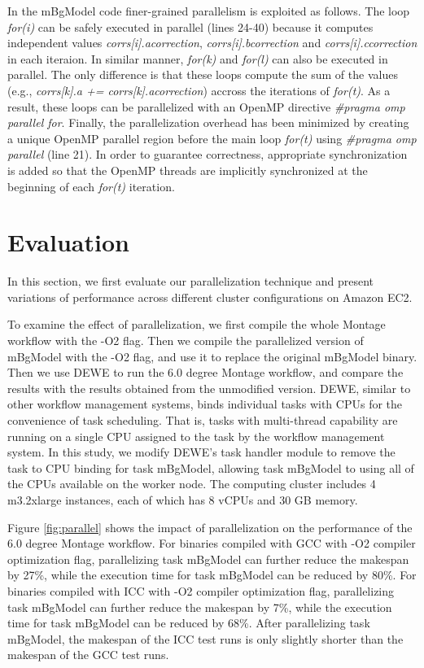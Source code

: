 In the mBgModel code finer-grained parallelism is exploited as follows. The loop {\em for(i)} can be safely executed in parallel (lines 24-40) because it computes independent values {\em corrs[i].acorrection}, {\em corrs[i].bcorrection} and {\em corrs[i].ccorrection} in each iteraion. In similar manner, {\em for(k)} and {\em for(l)} can also be executed in parallel. The only difference is that these loops compute the sum of the values (e.g., {\em corrs[k].a += corrs[k].acorrection}) accross the iterations of {\em for(t)}. As a result, these loops can be parallelized with an OpenMP directive {\em \#pragma omp parallel for}. Finally, the parallelization overhead has been minimized by creating a unique OpenMP parallel region before the main loop {\em for(t)} using {\em \#pragma omp parallel} (line 21). In order to guarantee correctness, appropriate synchronization is added so that the OpenMP threads are implicitly synchronized at the beginning of each {\em for(t)} iteration.


\section{Evaluation}
\label{v1_sec:eval}

In this section, we first evaluate our parallelization technique and present variations of performance across different cluster configurations on Amazon EC2.

To examine the effect of parallelization, we first compile the whole Montage workflow with the -O2 flag. Then we compile the parallelized version of mBgModel with the -O2 flag, and use it to replace the original mBgModel binary. Then we use DEWE to run the 6.0 degree Montage workflow, and compare the results with the results obtained from the unmodified version. DEWE, similar to other workflow management systems, binds individual tasks with CPUs for the convenience of task scheduling. That is, tasks with multi-thread capability are running on a single CPU assigned to the task by the workflow management system. In this study, we modify DEWE's task handler module to remove the task to CPU binding for task mBgModel, allowing task mBgModel to using all of the CPUs available on the worker node. The computing cluster includes 4 m3.2xlarge instances, each of which has 8 vCPUs and 30 GB memory. 

Figure \ref{fig:parallel} shows the impact of parallelization on the performance of the 6.0 degree Montage workflow. For binaries compiled with GCC with -O2 compiler optimization flag, parallelizing task mBgModel can further reduce the makespan by 27\%, while the execution time for task mBgModel can be reduced by 80\%. For binaries compiled with ICC with -O2 compiler optimization flag, parallelizing task mBgModel can further reduce the makespan by 7\%, while the execution time for task mBgModel can be reduced by 68\%. After parallelizing task mBgModel, the makespan of the ICC test runs is only slightly shorter than the makespan of the GCC test runs.

